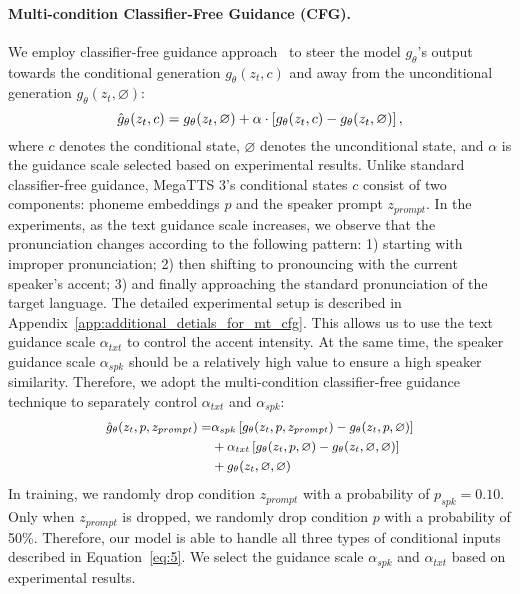 \paragraph{Multi-condition Classifier-Free Guidance (CFG).}
We employ classifier-free guidance approach~\citep{ho2022classifier} to steer the model $g_{\theta}$'s output towards the conditional generation $g_{\theta}(z_t,c)$ and away from the unconditional generation $g_{\theta}(z_t,\varnothing)$:
\begin{equation}
    \small
    \hat{g}_{\theta}(z_t, c) = g_{\theta}(z_t, \varnothing) + \alpha \cdot \left[ g_{\theta}(z_t, c) - g_{\theta}(z_t, \varnothing) \right],
    \label{eq:4}
\end{equation}
where $c$ denotes the conditional state, $\varnothing$ denotes the unconditional state, and $\alpha$ is the guidance scale selected based on experimental results. Unlike standard classifier-free guidance, MegaTTS 3's conditional states $c$ consist of two components: phoneme embeddings $p$ and the speaker prompt $z_{prompt}$. In the experiments, as the text guidance scale increases, we observe that the pronunciation changes according to the following pattern: 1) starting with improper pronunciation; 2) then shifting to pronouncing with the current speaker's accent; 3) and finally approaching the standard pronunciation of the target language. The detailed experimental setup is described in Appendix~\ref{app:additional_detials_for_mt_cfg}. This allows us to use the text guidance scale $\alpha_{txt}$ to control the accent intensity. At the same time, the speaker guidance scale $\alpha_{spk}$ should be a relatively high value to ensure a high speaker similarity. Therefore, we adopt the multi-condition classifier-free guidance technique to separately control $\alpha_{txt}$ and $\alpha_{spk}$:
\begin{equation}
    \small
    \begin{split}
    \hat{g}_{\theta}(z_t, p, z_{prompt}) = & \alpha_{spk} \left[ g_{\theta}(z_t, p, z_{prompt}) - g_{\theta}(z_t, p, \varnothing) \right] \\
    & + \alpha_{txt} \left[ g_{\theta}(z_t, p, \varnothing) - g_{\theta}(z_t, \varnothing, \varnothing) \right] \\ 
    & + g_{\theta}(z_t, \varnothing, \varnothing) \\
    \end{split}
    \label{eq:5}
\end{equation}
In training, we randomly drop condition $z_{prompt}$ with a probability of $p_{spk} = 0.10$. Only when $z_{prompt}$ is dropped, we randomly drop condition $p$ with a probability of 50\%. Therefore, our model is able to handle all three types of conditional inputs described in Equation~\ref{eq:5}. We select the guidance scale $\alpha_{spk}$ and $\alpha_{txt}$ based on experimental results.